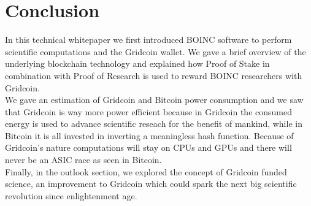\section{Conclusion}

In this technical whitepaper we first introduced BOINC software to perform scientific computations and the Gridcoin wallet. We gave a brief overview of the underlying blockchain technology and explained how Proof of Stake in combination with Proof of Research is used to reward BOINC researchers with Gridcoin. \\

We gave an estimation of Gridcoin and Bitcoin power consumption and we saw that Gridcoin is way more power efficient because in Gridcoin the consumed energy is used to advance scientific reseach for the benefit of mankind, while in Bitcoin it is all invested in inverting a meaningless hash function. Because of Gridcoin's nature computations will stay on CPUs and GPUs and there will never be an ASIC race as seen in Bitcoin.\\

Finally, in the outlook section, we explored the concept of Gridcoin funded science, an improvement to Gridcoin which could spark the next big scientific revolution since enlightenment age.\\


